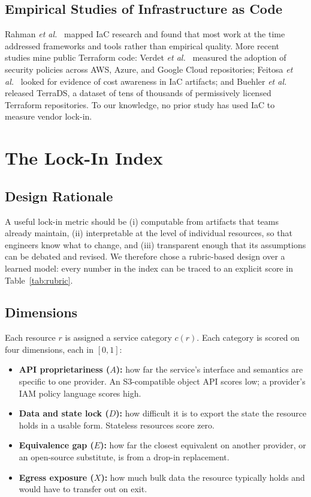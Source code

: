\documentclass[conference]{IEEEtran}
\begin{document}
\subsection{Empirical Studies of Infrastructure as Code}
Rahman \textit{et al.}~\cite{rahman2019} mapped IaC research and found that most work at the time addressed frameworks and tools rather than empirical quality. More recent studies mine public Terraform code: Verdet \textit{et al.}~\cite{verdet2025} measured the adoption of security policies across AWS, Azure, and Google Cloud repositories; Feitosa \textit{et al.}~\cite{feitosa2023} looked for evidence of cost awareness in IaC artifacts; and Buehler \textit{et al.}~\cite{buehler2025} released TerraDS, a dataset of tens of thousands of permissively licensed Terraform repositories. To our knowledge, no prior study has used IaC to measure vendor lock-in.

\section{The Lock-In Index}
\label{sec:method}

\subsection{Design Rationale}
A useful lock-in metric should be (i) computable from artifacts that teams already maintain, (ii) interpretable at the level of individual resources, so that engineers know what to change, and (iii) transparent enough that its assumptions can be debated and revised. We therefore chose a rubric-based design over a learned model: every number in the index can be traced to an explicit score in Table~\ref{tab:rubric}.

\subsection{Dimensions}
Each resource $r$ is assigned a service category $c(r)$. Each category is scored on four dimensions, each in $[0,1]$:
\begin{itemize}
\item \textbf{API proprietariness ($A$):} how far the service's interface and semantics are specific to one provider. An S3-compatible object API scores low; a provider's IAM policy language scores high.
\item \textbf{Data and state lock ($D$):} how difficult it is to export the state the resource holds in a usable form. Stateless resources score zero.
\item \textbf{Equivalence gap ($E$):} how far the closest equivalent on another provider, or an open-source substitute, is from a drop-in replacement.
\item \textbf{Egress exposure ($X$):} how much bulk data the resource typically holds and would have to transfer out on exit.
\end{itemize}
\end{document}
